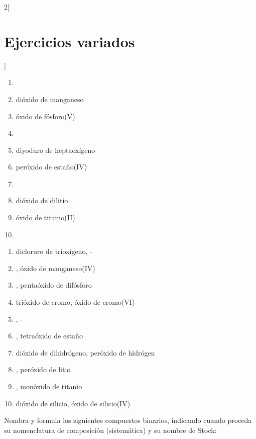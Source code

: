 \documentclass[10pt]{article}
\begin{document}
\begin{multicols*}{2}[
  \section{Ejercicios variados}
  ]
\begin{exercise}[
    tags    = {inorgánica,compuestos binarios,óxidos,peróxidos},
    topics  = {química inorgánica,formulación,nomenclatura},
    source  = {SAN Formulación, p27, e32},
  ]
  \begin{enumerate}
    \item {}
    \item dióxido de manganeso
    \item óxido de fósforo(V)
    \item {}
    \item diyoduro de heptaoxígeno
    \item peróxido de estaño(IV)
    \item {}
    \item dióxido de dilitio
    \item óxido de titanio(II)
    \item {}
  \end{enumerate}
\end{exercise}

\begin{solution}
  \begin{enumerate}
    \item dicloruro de trioxígeno, -
    \item {}, óxido de manganeso(IV)
    \item {}, pentaóxido de difósforo
    \item trióxido de cromo, óxido de cromo(VI)
    \item {}, -
    \item {}, tetraóxido de estaño
    \item dióxido de dihidrógeno, peróxido de hidrógen
    \item {}, peróxido de litio
    \item {}, monóxido de titanio
    \item dióxido de silicio, óxido de silicio(IV)
  \end{enumerate}
\end{solution}




\begin{exercise}[
    tags    = {inorgánica,compuestos binarios,óxidos,peróxidos,hidróxidos},
    topics  = {química inorgánica,formulación,nomenclatura},
    source  = {SAN Formulación, p27, e33},
  ]
  Nombra y formula los siguientes compuestos binarios, indicando cuando proceda su nomenclatura de composición (sistemática) y su nombre de Stock:


\end{exercise}
\end{multicols*}
\end{document}
